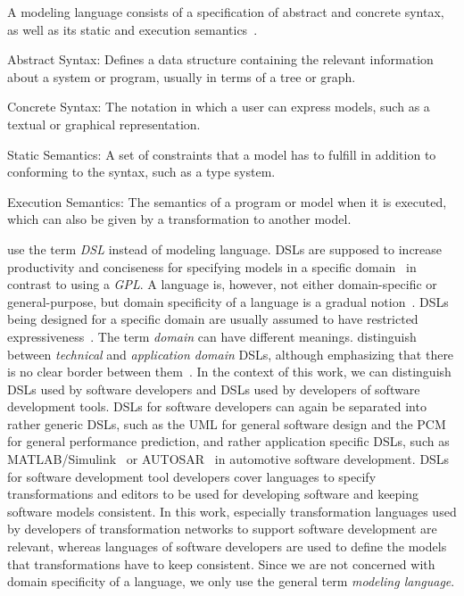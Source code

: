 A modeling language consists of a specification of abstract and concrete syntax, as well as its static and execution semantics~\cite[p.~26]{voelter2013DslEngineering}.
\begin{properdescription}
    \item[Abstract Syntax:] Defines a data structure containing the relevant information about a system or program, usually in terms of a tree or graph.
    \item[Concrete Syntax:] The notation in which a user can express models, such as a textual or graphical representation.
    \item[Static Semantics:] A set of constraints that a model has to fulfill in addition to conforming to the syntax, such as a type system.
    \item[Execution Semantics:] The semantics of a program or model when it is executed, which can also be given by a transformation to another model. 
\end{properdescription}

\textcite{voelter2013DslEngineering} use the term \emph{\gls{DSL}} instead of modeling language.
\Glspl{DSL} are supposed to increase productivity and conciseness for specifying models in a specific domain~\cite[p.~30]{voelter2013DslEngineering} in contrast to using a \emph{\gls{GPL}}.
A language is, however, not either domain-specific or general-purpose, but domain specificity of a language is a gradual notion~\cite[p.~30]{voelter2013DslEngineering}.
\Glspl{DSL} being designed for a specific domain are usually assumed to have restricted expressiveness~\cite[Chap.~2]{fowler2010dsls-Book}.
The term \emph{domain} can have different meanings.
\citeauthor{voelter2013DslEngineering} distinguish between \emph{technical} and \emph{application domain} \glspl{DSL}, although emphasizing that there is no clear border between them~\cite[p.~26]{voelter2013DslEngineering}.
In the context of this work, we can distinguish \glspl{DSL} used by software developers and \glspl{DSL} used by developers of software development tools.
\glspl{DSL} for software developers can again be separated into rather generic \glspl{DSL}, such as the \gls{UML} for general software design and the \gls{PCM} for general performance prediction, and rather application specific \glspl{DSL}, such as MATLAB/Simulink~\cite{simulink} or AUTOSAR~\cite{scheid2015autosar} in automotive software development.
\glspl{DSL} for software development tool developers cover languages to specify transformations and editors to be used for developing software and keeping software models consistent.
In this work, especially transformation languages used by developers of transformation networks to support software development are relevant, whereas languages of software developers are used to define the models that transformations have to keep consistent.
Since we are not concerned with domain specificity of a language, we only use the general term \emph{modeling language}.

